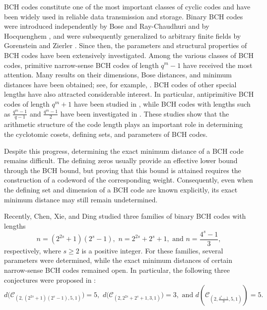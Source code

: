 \documentclass[12pt,draftcls,journal,onecolumn]{IEEEtran}
\begin{document}
BCH codes constitute one of the most important classes of cyclic codes and
have been widely used in reliable data transmission and storage. Binary BCH
codes were introduced independently by Bose and Ray-Chaudhuri and by
Hocquenghem \cite{Bose62,Hocquenghem59}, and were subsequently generalized
to arbitrary finite fields by Gorenstein and Zierler
\cite{Gorenstein61}. Since then, the parameters and structural properties of
BCH codes have been extensively investigated.
Among the various classes of BCH codes, primitive narrow-sense BCH codes
of length $q^m-1$ have received the most attention. Many results on their
dimensions, Bose distances, and minimum distances have been obtained; see,
for example,
\cite{Aly07,Augot94,Charpin90,Ding15,Ding17,Liu17,Lid17,Yue15,Dianwu96}.
BCH codes of other special lengths have also attracted considerable
interest. In particular, antiprimitive BCH codes of length $q^m+1$ have
been studied in \cite{Lid017,Liu17,Li2019,Yan2018}, while BCH codes with
lengths such as
$
\frac{q^m-1}{q-1}
$ and
$\frac{q^m-1}{2}
$
have been investigated in
\cite{Li2017,Ling23,Yan2018,Zhu19}.
These studies show that the arithmetic structure of the code length plays
an important role in determining the cyclotomic cosets, defining sets, and
parameters of BCH codes.


Despite this progress, determining the exact minimum distance of a BCH code remains difficult.
The defining zeros usually provide an effective lower bound through the BCH bound, but proving
that this bound is attained requires the construction of a codeword of the corresponding weight.
Consequently, even when the defining set and dimension of a BCH code are known explicitly, its
exact minimum distance may still remain undetermined.

Recently, Chen, Xie, and Ding \cite{Chen59} studied three families of binary BCH codes with
lengths
\[
n=(2^{2s}+1)(2^s-1),\,\,
n=2^{2s}+2^s+1,\text{ and }
n=\frac{4^s-1}{3},
\]
respectively, where $s\geq 2$ is a positive integer. For these families, several parameters were determined, while the exact minimum
distances of certain narrow-sense BCH codes remained open. In particular, the following three
conjectures were proposed in \cite{Chen59}:
\[
d\bigl(\mathcal{C}_{(2,(2^{2s}+1)(2^s-1),5,1)}\bigr)=5,
\,\,
d\bigl(\mathcal{C}_{(2,2^{2s}+2^s+1,3,1)}\bigr)=3,
\text{ and }
d\left(\mathcal{C}_{\left(2,\frac{4^s-1}{3},5,1\right)}\right)=5.
\]
\end{document}
